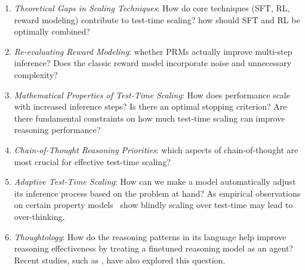 \begin{enumerate}
    \item \textit{Theoretical Gaps in Scaling Techniques}: How do core techniques (SFT, RL, reward modeling) contribute to test-time scaling? how should SFT and RL be optimally combined?
    \item \textit{Re-evaluating Reward Modeling}: whether PRMs actually improve multi-step inference? Does the classic reward model incorporate noise and unnecessary complexity?
    \item \textit{Mathematical Properties of Test-Time Scaling}: How does performance scale with increased inference steps? Is there an optimal stopping criterion? Are there fundamental constraints on how much test-time scaling can improve reasoning performance?
    \item \textit{Chain-of-Thought Reasoning Priorities}: which aspects of chain-of-thought are most crucial for effective test-time scaling?
    \item \textit{Adaptive Test-Time Scaling}: How can we make a model automatically adjust its inference process based on the problem at hand? As empirical observations on certain property models~\citep{xai-gork3} show blindly scaling over test-time may lead to over-thinking.
    \item \textit{Thoughtology}: How do the reasoning patterns in its language help improve reasoning effectiveness by treating a finetuned reasoning model as an agent? Recent studies, such as \citet{marjanović2025deepseekr1thoughtologyletsthink,wu2024comparativestudyreasoningpatterns}, have also explored this question.
\end{enumerate}





